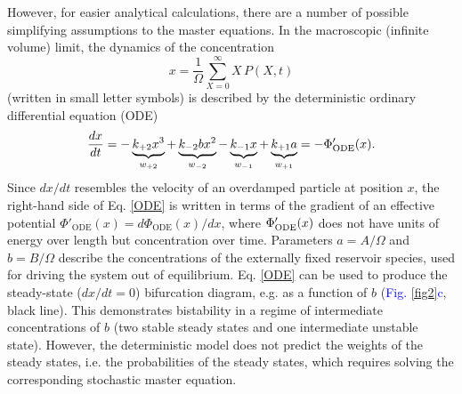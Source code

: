 \documentclass[aps,prl,reprint,singlecolumn,superscriptaddress]{revtex4}
\begin{document}
{However, for easier analytical calculations, there are a number of possible simplifying assumptions to the master equations.
In the macroscopic (infinite volume) limit, the dynamics of the concentration 
\begin{equation}
x=\frac{1}{\Omega}\sum_{X=0}^\infty X\,P(X,t)\label{x}
\end{equation}
(written in small letter symbols) is described by the deterministic ordinary differential equation (ODE)
\begin{equation}
\frac{dx}{dt}=-\underbrace{k_{+2}x^3}_{w_{+2}}+\underbrace{k_{-2}bx^2}_{w_{-2}}
-\underbrace{k_{-1}x}_{w_{-1}}+\underbrace{k_{+1}a}_{w_{+1}}=-\Phi'_{\rm ODE}(x).\label{ODE}
\end{equation} 
{Since $dx/dt$ resembles the velocity of an overdamped particle at position $x$, the right-hand side of
Eq. \ref{ODE} is written in terms of the gradient of an effective potential $\Phi'_\text{ODE}(x)=d\Phi_\text{ODE}(x)/dx$,
where $\Phi'_{\rm ODE}(x)$ does not have units of energy over length but concentration over time.
Parameters $a=A/\Omega$ and $b=B/\Omega$ describe the concentrations of the externally fixed reservoir species, used for driving the 
system out of equilibrium.} Eq. \ref{ODE} can be used to produce the steady-state ($dx/dt=0$) bifurcation diagram, e.g. as a function of 
$b$ (\textcolor{blue}{Fig. \ref{fig2}c}, black line). This demonstrates bistability in a regime of intermediate concentrations of $b$ 
(two stable steady states and one intermediate unstable state). However, the deterministic model does not predict the weights of the steady 
states, {i.e. the probabilities of the steady states}, which requires solving the corresponding stochastic master equation. 

}
\end{document}
